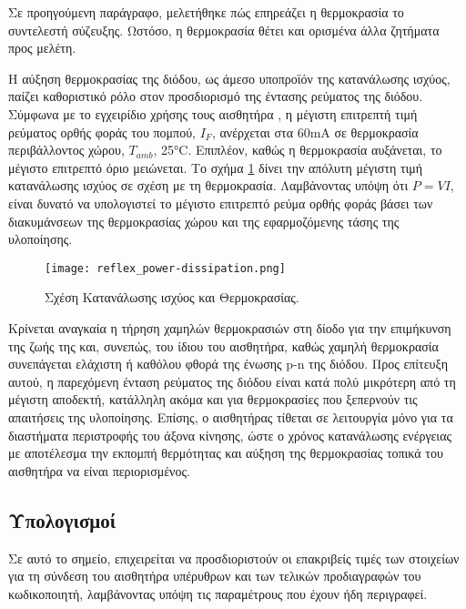 Σε προηγούμενη παράγραφο, μελετήθηκε πώς επηρεάζει η θερμοκρασία το συντελεστή
σύζευξης. Ωστόσο, η θερμοκρασία θέτει και ορισμένα άλλα ζητήματα προς μελέτη.

Η αύξηση θερμοκρασίας της διόδου, ως άμεσο υποπροϊόν της κατανάλωσης ισχύος,
παίζει καθοριστικό ρόλο στον προσδιορισμό της έντασης ρεύματος της διόδου.
Σύμφωνα με το εγχειρίδιο χρήσης τους αισθητήρα \parencite{vishay09}, η μέγιστη
επιτρεπτή τιμή ρεύματος ορθής φοράς του πομπού, $I_F$, ανέρχεται στα 60mA σε
θερμοκρασία περιβάλλοντος χώρου, $T_{amb}$, 25°C. Επιπλέον, καθώς η θερμοκρασία
αυξάνεται, το μέγιστο επιτρεπτό όριο μειώνεται.
Το σχήμα \ref{fig:reflex:power-dissipation} δίνει την απόλυτη μέγιστη τιμή
κατανάλωσης ισχύος σε σχέση με τη θερμοκρασία. Λαμβάνοντας υπόψη ότι $P = VI$,
είναι δυνατό να υπολογιστεί το μέγιστο επιτρεπτό ρεύμα ορθής φοράς βάσει των
διακυμάνσεων της θερμοκρασίας χώρου και της εφαρμοζόμενης τάσης της υλοποίησης.

\begin{figure}
    \caption{Σχέση Κατανάλωσης ισχύος και Θερμοκρασίας.
    \label{fig:reflex:power-dissipation}}
    \begin{center}%
    \texttt{[image: reflex\_power-dissipation.png]}
    \end{center}

\end{figure}

Κρίνεται αναγκαία η τήρηση χαμηλών θερμοκρασιών στη δίοδο για την επιμήκυνση της
ζωής της και, συνεπώς, του ίδιου του αισθητήρα, καθώς χαμηλή θερμοκρασία
συνεπάγεται ελάχιστη ή καθόλου φθορά της ένωσης p-n της διόδου. Προς επίτευξη
αυτού, η παρεχόμενη ένταση ρεύματος της διόδου είναι κατά πολύ μικρότερη από τη
μέγιστη αποδεκτή, κατάλληλη ακόμα και για θερμοκρασίες που ξεπερνούν τις
απαιτήσεις της υλοποίησης. Επίσης, ο αισθητήρας τίθεται σε λειτουργία μόνο για
τα διαστήματα περιστροφής του άξονα κίνησης, ώστε ο χρόνος κατανάλωσης ενέργειας
με αποτέλεσμα την εκπομπή θερμότητας και αύξηση της θερμοκρασίας τοπικά του
αισθητήρα να είναι περιορισμένος.

\subsection{Υπολογισμοί}

Σε αυτό το σημείο, επιχειρείται να προσδιοριστούν οι επακριβείς τιμές των
στοιχείων για τη σύνδεση του αισθητήρα υπέρυθρων και των τελικών προδιαγραφών
του κωδικοποιητή, λαμβάνοντας υπόψη τις παραμέτρους που έχουν ήδη περιγραφεί.

